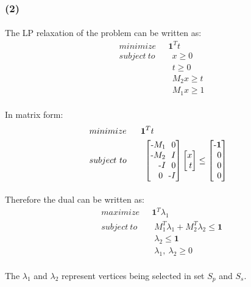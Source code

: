 \subsubsection*{(2)}
\paragraph{}
The LP relaxation of the problem can be written as:
\begin{align*}
& minimize \quad \ \  \textbf{1}^T t \\
& subject \ to \qquad x \geq 0\\
&\qquad \qquad \quad \quad \ t \geq 0\\
&\qquad \qquad \quad \quad \ M_2 x \geq t\\
&\qquad \qquad \quad \quad \ M_1 x \geq 1
\end{align*}
\paragraph{}
In matrix form:
\begin{align*}
& minimize \quad \ \  \textbf{1}^T t \\
& subject \ to \qquad \begin{bmatrix*}[r]
$-$M_1 \ \  0\\ 
$-$M_2 \ \ I\\
$-$I   \ \ 0\\
0      \ \ $-$I\\
\end{bmatrix*}
\begin{bmatrix*}[r]
x\\ t\\
\end{bmatrix*} \leq 
\begin{bmatrix*}[r]
$-$\textbf{1} \\ 0 \\ 0 \\ 0\\
\end{bmatrix*}
\end{align*}
\paragraph{}
Therefore the dual can be written as:
\begin{align*}
& maximize \quad \ \  \textbf{1}^T\lambda_1 \\
& subject \ to \qquad M_1^T\lambda_1 + M_2^T\lambda_2 \leq \textbf{1}\\
&\qquad \qquad \quad \quad \ \lambda_2 \leq \textbf{1} \\
&\qquad \qquad \quad \quad \ \lambda_1, \ \lambda_2 \geq 0
\end{align*}
\paragraph{}
The $\lambda_1$ and $\lambda_2$ represent vertices being selected in set $S_p$ and $S_s$. 